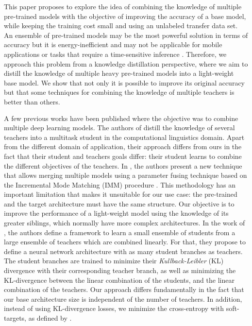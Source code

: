 \documentclass{elsarticle}
\begin{document}
	
	 This paper proposes to explore the idea of combining the knowledge of multiple pre-trained models with the objective of improving the accuracy of a base model, while keeping the training cost small and using an unlabeled transfer data set. 	An ensemble of pre-trained models may be the most powerful solution in terms of accuracy but it is energy-inefficient and may not be applicable for mobile applications or tasks that require a time-sensitive inference \citep{sanchez2020}. Therefore, we approach this problem from a knowledge distillation perspective, where we aim to distill the knowledge of multiple heavy pre-trained models into a light-weight base model. We show that not only it is possible to improve its original accuracy but that some techniques for combining the knowledge of multiple teachers is better than others. 
	
	A few previous works have been published where the objective was to combine multiple deep learning models. The authors of \citep{liu2020} distill the knowledge of several teachers into a multitask student in the computational linguistics domain. Apart from the different domain of application, their approach differs from ours in the fact that their student and teachers goals differ: their student learns to combine the different objectives of the teachers. In \citep{geyer2019}, the authors present a new technique that allows merging multiple models using a parameter fusing technique based on the Incremental Mode Matching (IMM) procedure \citep{lee2017}. This methodology has an important limitation that makes it unsuitable for our use case: the pre-trained and the target architecture must have the same structure. Our objective is to improve the performance of a light-weight model using the knowledge of its greater siblings, which normally have more complex architectures. In the work of \citep{asif2019}, the authors define a framework to learn a small ensemble of students from a large ensemble of teachers which are combined linearly. For that, they propose to define a neural network architecture with as many student branches as teachers. The student branches are trained to minimize their \textit{Kullback-Leibler} (KL) divergence with their corresponding teacher branch, as well as minimizing the KL-divergence between the linear combination of the students, and the linear combination of the teachers. Our approach differs fundamentally in the fact that our base architecture size is independent of the number of teachers. In addition, instead of using KL-divergence losses, we minimize the cross-entropy with soft-targets, as defined by \citep{hinton2015}.
	
\end{document}
